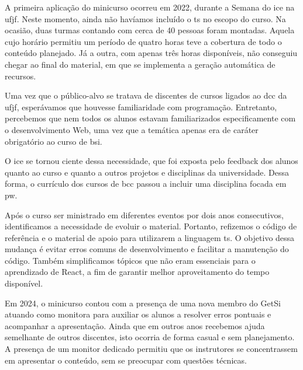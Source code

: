 A primeira aplicação do minicurso ocorreu em 2022, durante a Semana do \gls{ice} na \gls{ufjf}.
Neste momento, ainda não havíamos incluído o \gls{ts} no escopo do curso.
Na ocasião, duas turmas contando com cerca de 40 pessoas foram montadas.
Aquela cujo horário permitiu um período de quatro horas teve a cobertura de todo o conteúdo planejado.
Já a outra, com apenas três horas disponíveis, não conseguiu chegar ao final do material, em que se implementa a geração automática de recursos.

Uma vez que o público-alvo se  tratava de discentes de cursos ligados ao \gls{dcc} da \gls{ufjf}, esperávamos que houvesse familiaridade com programação.
Entretanto, percebemos que nem todos os alunos estavam familiarizados especificamente com o desenvolvimento Web, uma vez que a temática apenas era de caráter obrigatório ao curso de \gls{bsi}.

O \gls{ice} se tornou ciente dessa necessidade, que foi exposta pelo feedback dos alunos quanto ao curso e quanto a outros projetos e disciplinas da universidade.
Dessa forma, o currículo dos cursos de \gls{bcc} passou a incluir uma disciplina focada em \gls{pw}.

Após o curso ser ministrado em diferentes eventos por dois anos consecutivos, identificamos a necessidade de evoluir o material.
Portanto, refizemos o código de referência e o material de apoio para utilizarem a linguagem \gls{ts}.
O objetivo dessa mudança é evitar erros comuns de desenvolvimento e facilitar a manutenção do código.
Também simplificamos tópicos que não eram essenciais para o aprendizado de React, a fim de garantir melhor aproveitamento do tempo disponível.

Em 2024, o minicurso contou com a presença de uma nova membro do GetSi atuando como monitora para auxiliar os alunos a resolver erros pontuais e acompanhar a apresentação.
Ainda que em outros anos recebemos ajuda semelhante de outros discentes, isto ocorria de forma casual e sem planejamento.
A presença de um monitor dedicado permitiu que os instrutores se concentrassem em apresentar o conteúdo, sem se preocupar com questões técnicas.

